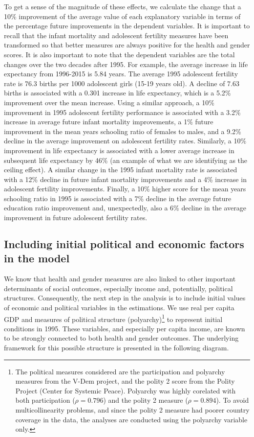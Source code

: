 \documentclass[12pt]{article}
\begin{document}
To get a sense of the magnitude of these effects, we calculate the change that a 10\% improvement of the average value of each explanatory variable in terms of the percentage future improvements in the dependent variables. It is important to recall that the infant mortality and adolescent fertility measures have been transformed so that better measures are always positive for the health and gender scores. It is also important to note that the dependent variables are the total changes over the two decades after 1995. For example, the average increase in life expectancy from 1996-2015 is 5.84 years. The average 1995 adolescent fertility rate is 76.3 births per 1000 adolescent girls (15-19 years old). A decline of 7.63 births is associated with a 0.301 increase in life expectancy, which is a 5.2\% improvement over the mean increase. Using a similar approach, a 10\% improvement in 1995 adolescent fertility performance is associated with a 3.2\% increase in average future infant mortality improvements, a 1\% future improvement in the mean years schooling ratio of females to males, and a 9.2\% decline in the average improvement on adolescent fertility rates. Similarly, a 10\% improvement in life expectancy is associated with a lower average increase in subsequent life expectancy by 46\% (an example of what we are identifying as the ceiling effect). A similar change in the 1995 infant mortality rate is associated with a 12\% decline in future infant mortality improvements and a 4\% increase in adolescent fertility improvements. Finally, a 10\% higher score for the mean years schooling ratio in 1995 is associated with a 7\% decline in the average future education ratio improvement and, unexpectedly, also a 6\% decline in the average improvement in future adolescent fertility rates.

\subsection{Including initial political and economic factors in the model}

We know that health and gender measures are also linked to other important determinants of social outcomes, especially income and, potentially, political structures. Consequently, the next step in the analysis is to include initial values of economic and political variables in the estimations. We use real per capita GDP and measures of political structure (polyarchy)\footnote{
The political measures considered are the participation and polyarchy measures from the V-Dem project, and the polity 2 score from the Polity Project (Center for Systemic Peace). Polyarchy was highly corelated with both participation ($\rho = 0.796$) and the polity 2 measure ($\rho = 0.894$). To avoid multicollinearity problems, and since the polity 2 measure had poorer country coverage in the data, the analyses are conducted using the polyarchy variable only.}
to represent initial conditions in 1995. These variables, and especially per capita income, are known to be strongly connected to both health and gender outcomes. The underlying framework for this possible structure is presented in the following diagram.
\end{document}
